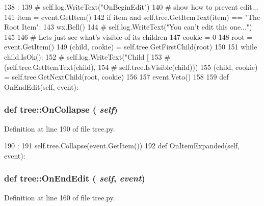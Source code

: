 \begin{DoxyCode}
138                                 :
139 #        self.log.WriteText("OnBeginEdit\n")
140         # show how to prevent edit...
141         item = event.GetItem()
142         if item and self.tree.GetItemText(item) == "The Root Item":
143             wx.Bell()
144 #            self.log.WriteText("You can't edit this one...\n")
145 
146             # Lets just see what's visible of its children
147             cookie = 0
148             root = event.GetItem()
149             (child, cookie) = self.tree.GetFirstChild(root)
150 
151             while child.IsOk():
152 #                self.log.WriteText("Child [%
153 #                                   (self.tree.GetItemText(child),
154 #                                    self.tree.IsVisible(child)))
155                 (child, cookie) = self.tree.GetNextChild(root, cookie)
156 
157             event.Veto()
158 
159 
    def OnEndEdit(self, event):
\end{DoxyCode}
\hypertarget{namespacetree_aa3ee8c84f15f385407b67d3a01f324a4}{
\subsubsection[{OnCollapse}]{\setlength{\rightskip}{0pt plus 5cm}def tree::OnCollapse ( {\em self})}}
\label{namespacetree_aa3ee8c84f15f385407b67d3a01f324a4}


Definition at line 190 of file tree.py.


\begin{DoxyCode}
190                         :
191         self.tree.Collapse(event.GetItem())
192 
    def OnItemExpanded(self, event):
\end{DoxyCode}
\hypertarget{namespacetree_a9e40112ab7c6ffcb3419fae08edb9563}{
\subsubsection[{OnEndEdit}]{\setlength{\rightskip}{0pt plus 5cm}def tree::OnEndEdit ( {\em self}, \/   {\em event})}}
\label{namespacetree_a9e40112ab7c6ffcb3419fae08edb9563}


Definition at line 160 of file tree.py.


